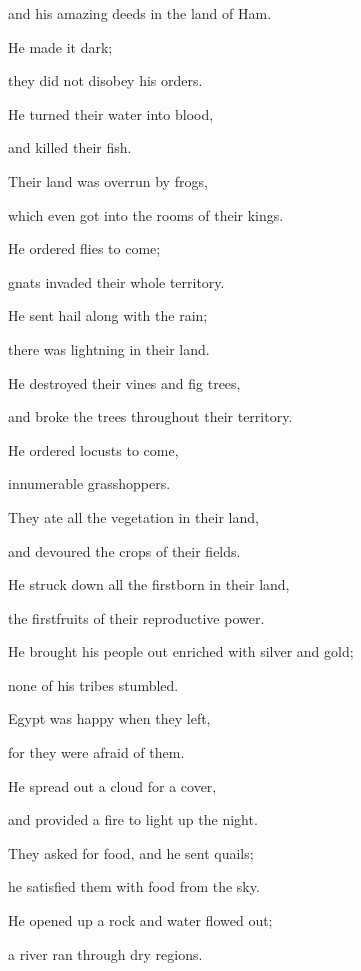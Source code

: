 {\par }{\Q and his amazing
deeds in the land
of Ham.
\par }{\Q {}He made
it dark;
\par }{\Q they did not
disobey
his orders.
\par }{\Q {}He turned
their water
into blood,
\par }{\Q and killed
their fish.
\par }{\Q {}Their land
was overrun
by frogs,
\par }{\Q which even got into the rooms
of their kings.
\par }{\Q {}He ordered
flies
to come;
\par }{\Q gnats
invaded their whole
territory.
\par }{\Q {}He sent
hail
along with the rain;
\par }{\Q there was lightning
in their land.
\par }{\Q {}He destroyed
their vines
and fig trees,
\par }{\Q and broke
the trees
throughout their territory.
\par }{\Q {}He ordered
locusts
to come,
\par }{\Q innumerable
grasshoppers.
\par }{\Q {}They ate
all
the vegetation
in their land,
\par }{\Q and devoured
the crops
of their fields.
\par }{\Q {}He struck
down all
the firstborn
in their land,
\par }{\Q the firstfruits
of their reproductive power.
\par }{\Q {}He brought his people out
enriched with silver
and gold;
\par }{\Q none
of his tribes
stumbled.
\par }{\Q {}Egypt
was happy
when they left,
\par }{\Q for
they were
afraid of them.
\par }{\Q {}He spread
out a cloud
for a cover,
\par }{\Q and provided a fire
to light
up the night.
\par }{\Q {}They asked
for food, and he sent
quails;
\par }{\Q he satisfied
them with food
from the sky.
\par }{\Q {}He opened
up a rock
and water
flowed
out;
\par }{\Q a river
ran through dry regions.
}
